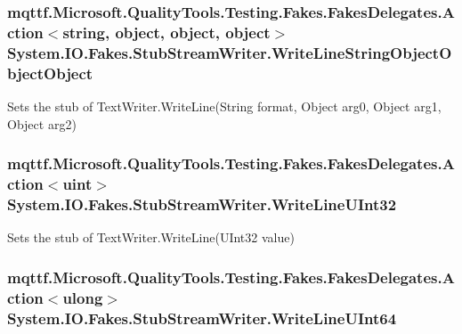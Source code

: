 \hypertarget{class_system_1_1_i_o_1_1_fakes_1_1_stub_stream_writer_a29613edec7c7969a6bf276f79f81c901}{
\subsubsection[{Write\-Line\-String\-Object\-Object\-Object}]{\setlength{\rightskip}{0pt plus 5cm}mqttf.\-Microsoft.\-Quality\-Tools.\-Testing.\-Fakes.\-Fakes\-Delegates.\-Action$<$string, object, object, object$>$ System.\-I\-O.\-Fakes.\-Stub\-Stream\-Writer.\-Write\-Line\-String\-Object\-Object\-Object}}\label{class_system_1_1_i_o_1_1_fakes_1_1_stub_stream_writer_a29613edec7c7969a6bf276f79f81c901}


Sets the stub of Text\-Writer.\-Write\-Line(\-String format, Object arg0, Object arg1, Object arg2)

\hypertarget{class_system_1_1_i_o_1_1_fakes_1_1_stub_stream_writer_ae2c9ae5e3dbf0b67f9c981df20b0255e}{
\subsubsection[{Write\-Line\-U\-Int32}]{\setlength{\rightskip}{0pt plus 5cm}mqttf.\-Microsoft.\-Quality\-Tools.\-Testing.\-Fakes.\-Fakes\-Delegates.\-Action$<$uint$>$ System.\-I\-O.\-Fakes.\-Stub\-Stream\-Writer.\-Write\-Line\-U\-Int32}}\label{class_system_1_1_i_o_1_1_fakes_1_1_stub_stream_writer_ae2c9ae5e3dbf0b67f9c981df20b0255e}


Sets the stub of Text\-Writer.\-Write\-Line(\-U\-Int32 value)

\hypertarget{class_system_1_1_i_o_1_1_fakes_1_1_stub_stream_writer_a5669e1733ab1d73c9c6af78cc3f32caf}{
\subsubsection[{Write\-Line\-U\-Int64}]{\setlength{\rightskip}{0pt plus 5cm}mqttf.\-Microsoft.\-Quality\-Tools.\-Testing.\-Fakes.\-Fakes\-Delegates.\-Action$<$ulong$>$ System.\-I\-O.\-Fakes.\-Stub\-Stream\-Writer.\-Write\-Line\-U\-Int64}}\label{class_system_1_1_i_o_1_1_fakes_1_1_stub_stream_writer_a5669e1733ab1d73c9c6af78cc3f32caf}


